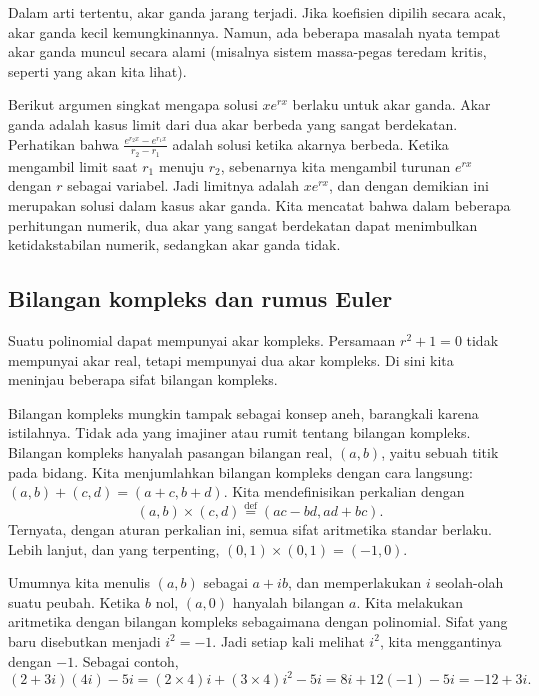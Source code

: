 Dalam arti tertentu, akar ganda jarang terjadi. Jika koefisien dipilih secara acak, akar ganda kecil kemungkinannya. Namun, ada beberapa masalah nyata tempat akar ganda muncul secara alami (misalnya sistem massa-pegas teredam kritis, seperti yang akan kita lihat).

Berikut argumen singkat mengapa solusi $x e^{r x}$ berlaku untuk akar ganda. Akar ganda adalah kasus limit dari dua akar berbeda yang sangat berdekatan. Perhatikan bahwa $\frac{e^{r_2 x} - e^{r_1 x}}{r_2 - r_1}$ adalah solusi ketika akarnya berbeda. Ketika mengambil limit saat $r_1$ menuju $r_2$, sebenarnya kita mengambil turunan $e^{rx}$ dengan $r$ sebagai variabel. Jadi limitnya adalah $x e^{rx}$, dan dengan demikian ini merupakan solusi dalam kasus akar ganda. Kita mencatat bahwa dalam beberapa perhitungan numerik, dua akar yang sangat berdekatan dapat menimbulkan ketidakstabilan numerik, sedangkan akar ganda tidak.

\subsection{Bilangan kompleks dan rumus Euler}

Suatu polinomial dapat mempunyai akar kompleks. Persamaan $r^2 + 1 = 0$ tidak mempunyai akar real, tetapi mempunyai dua akar kompleks. Di sini kita meninjau beberapa sifat bilangan kompleks.

Bilangan kompleks mungkin tampak sebagai konsep aneh, barangkali karena istilahnya. Tidak ada yang imajiner atau rumit tentang bilangan kompleks. Bilangan kompleks hanyalah pasangan bilangan real, $(a,b)$, yaitu sebuah titik pada bidang. Kita menjumlahkan bilangan kompleks dengan cara langsung: $(a,b)+(c,d)=(a+c,b+d)$. Kita mendefinisikan perkalian dengan
\begin{equation*}
(a,b) \times (c,d) \overset{\text{def}}{=} (ac-bd,ad+bc) .
\end{equation*}
Ternyata, dengan aturan perkalian ini, semua sifat aritmetika standar berlaku. Lebih lanjut, dan yang terpenting, $(0,1) \times (0,1) = (-1,0)$.

Umumnya kita menulis $(a,b)$ sebagai $a+ib$, dan memperlakukan $i$ seolah-olah suatu peubah. Ketika $b$ nol, $(a,0)$ hanyalah bilangan $a$. Kita melakukan aritmetika dengan bilangan kompleks sebagaimana dengan polinomial. Sifat yang baru disebutkan menjadi $i^2 = -1$. Jadi setiap kali melihat $i^2$, kita menggantinya dengan $-1$. Sebagai contoh,
\begin{equation*}
(2+3i)(4i) - 5i =
(2\times 4)i + (3 \times 4) i^2 - 5i
= 8i + 12 (-1) - 5i
= -12 + 3i .
\end{equation*}


